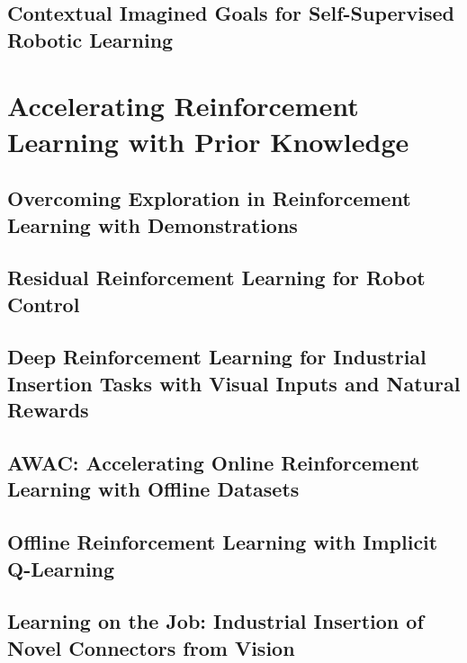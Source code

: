 \documentclass[ titlepage,numbers=noenddot,headinclude,
                footinclude=true,cleardoublepage=empty,abstractoff,
                BCOR=5mm,paper=letter,fontsize=12pt,
                american,
                openany
                ]{scrreprt}
\begin{document}
\chapter{Contextual Imagined Goals for Self-Supervised Robotic Learning}\label{chapter:ccrig}

\part{Accelerating Reinforcement Learning with Prior Knowledge}

 \chapter{Overcoming Exploration in Reinforcement Learning with Demonstrations}\label{chapter:bcddpg}

 \chapter{Residual Reinforcement Learning for Robot Control}\label{chapter:residualrl}

 \chapter{Deep Reinforcement Learning for Industrial Insertion Tasks with Visual Inputs and Natural Rewards}\label{chapter:insertion}

\chapter{AWAC: Accelerating Online Reinforcement Learning with Offline Datasets}\label{chapter:awac}

\chapter{Offline Reinforcement Learning with Implicit Q-Learning}\label{chapter:iql}

\chapter{Learning on the Job: Industrial Insertion of Novel Connectors from Vision}\label{chapter:daib}
\end{document}
